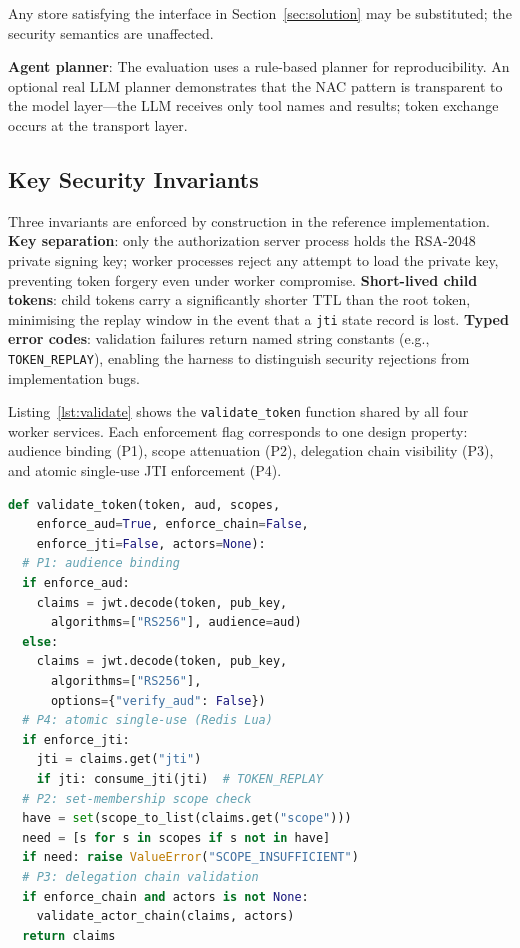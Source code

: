 \documentclass[journal]{IEEEtran}
\theoremstyle{definition}
\begin{document}
Any store satisfying the interface in Section~\ref{sec:solution} may be
substituted; the security semantics are unaffected.

\textbf{Agent planner}: The evaluation uses a rule-based planner for
reproducibility. An optional real LLM planner demonstrates that the NAC pattern
is transparent to the model layer---the LLM receives only tool names and results;
token exchange occurs at the transport layer.

\subsection{Key Security Invariants}

Three invariants are enforced by construction in the reference implementation.
\textbf{Key separation}: only the authorization server process holds the
RSA-2048 private signing key; worker processes reject any attempt to load the
private key, preventing token forgery even under worker compromise.
\textbf{Short-lived child tokens}: child tokens carry a significantly shorter
TTL than the root token, minimising the replay window in the event that a
\texttt{jti} state record is lost.
\textbf{Typed error codes}: validation failures return named string
constants (e.g., \texttt{TOKEN\_REPLAY}), enabling the harness to
distinguish security rejections from implementation bugs.

Listing~\ref{lst:validate} shows the \texttt{validate\_token} function shared
by all four worker services. Each enforcement flag corresponds to one design
property: audience binding (P1), scope attenuation (P2), delegation chain
visibility (P3), and atomic single-use JTI enforcement (P4).

\begin{lstlisting}[language=Python, label=lst:validate,
  caption={Worker token validation; each check maps to one
  design property (P1--P4).}]
def validate_token(token, aud, scopes,
    enforce_aud=True, enforce_chain=False,
    enforce_jti=False, actors=None):
  # P1: audience binding
  if enforce_aud:
    claims = jwt.decode(token, pub_key,
      algorithms=["RS256"], audience=aud)
  else:
    claims = jwt.decode(token, pub_key,
      algorithms=["RS256"],
      options={"verify_aud": False})
  # P4: atomic single-use (Redis Lua)
  if enforce_jti:
    jti = claims.get("jti")
    if jti: consume_jti(jti)  # TOKEN_REPLAY
  # P2: set-membership scope check
  have = set(scope_to_list(claims.get("scope")))
  need = [s for s in scopes if s not in have]
  if need: raise ValueError("SCOPE_INSUFFICIENT")
  # P3: delegation chain validation
  if enforce_chain and actors is not None:
    validate_actor_chain(claims, actors)
  return claims
\end{lstlisting}
\end{document}
